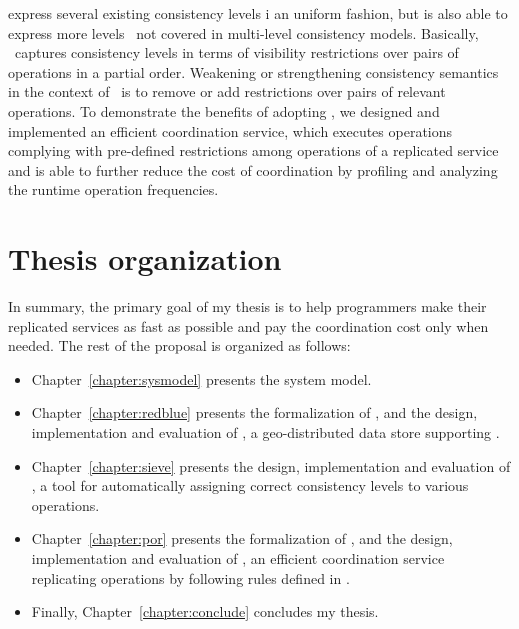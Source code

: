 \begin{itemize}
express several existing consistency levels i an uniform fashion, but is also 
able to express more levels~\cite{Li2015PoR} not covered in multi-level consistency models. Basically, \PRCN\ captures 
consistency levels in terms of visibility restrictions over pairs of operations in a 
partial order. Weakening or strengthening consistency semantics in the context 
of \PRCN\ is to remove or add restrictions over pairs of relevant operations. To 
demonstrate the benefits of adopting \PRCN,  we designed and implemented an 
efficient coordination service, which executes operations complying with 
pre-defined restrictions among operations of a replicated service and is able to further reduce 
the cost of coordination by profiling and analyzing the runtime operation 
frequencies.
\end{itemize}

\section{Thesis organization}

In summary, the primary goal of my thesis is to help programmers make their 
replicated services
as fast as possible and pay the coordination cost only when needed. The rest of 
the proposal is organized as follows:
\begin{itemize}
\item Chapter~\ref{chapter:sysmodel} presents the system model.
\item Chapter~\ref{chapter:redblue} presents the formalization of \RBCN, and the design,
implementation and evaluation of \Gemini, a geo-distributed data store supporting \RBCN.
\item Chapter~\ref{chapter:sieve} presents the design, implementation and evaluation of \tool, a tool for automatically
assigning correct consistency levels to various operations.
\item Chapter~\ref{chapter:por} presents the formalization of \PRCN,
and the design, implementation and evaluation of \coordtool, an efficient coordination service replicating operations by following rules defined in \PRCN. 
\item Finally, Chapter~\ref{chapter:conclude} concludes my thesis.
\end{itemize}
